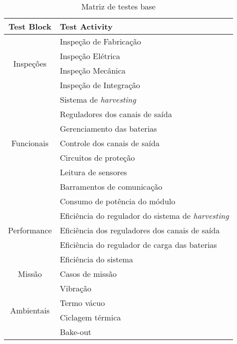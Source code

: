 \begin{table}
    \ABNTEXfontereduzida
    \centering
    \caption{Matriz de testes base}
    \begin{tabular}{cl}
        \toprule
        \textbf{Test Block} & \textbf{Test Activity} \\
        \midrule
        \midrule
        \multirow{4}{*}{Inspeções}      & Inspeção de Fabricação                \\
                                        & Inspeção Elétrica                     \\
                                        & Inspeção Mecânica                     \\
                                        & Inspeção de Integração                \\
        \midrule
        \multirow{7}{*}{Funcionais}     & Sistema de \textit{harvesting}        \\
                                        & Reguladores dos canais de saída       \\
                                        & Gerenciamento das baterias            \\
                                        & Controle dos canais de saída          \\
                                        & Circuitos de proteção                 \\
                                        & Leitura de sensores                   \\
                                        & Barramentos de comunicação            \\
        \midrule
        \multirow{5}{*}{Performance}    & Consumo de potência do módulo         \\
                                        & Eficiência do regulador do sistema de \textit{harvesting} \\
                                        & Eficiência dos reguladores dos canais de saída \\
                                        & Eficiência do regulador de carga das baterias \\
                                        & Eficiência do sistema                 \\
        \midrule
        Missão                          & Casos de missão                       \\
        \midrule
        \multirow{4}{*}{Ambientais}     & Vibração                              \\
                                        & Termo vácuo                           \\
                                        & Ciclagem térmica                      \\
                                        & Bake-out                              \\
        \bottomrule
    \end{tabular}
    \label{tab:matriz-base}
\end{table}


